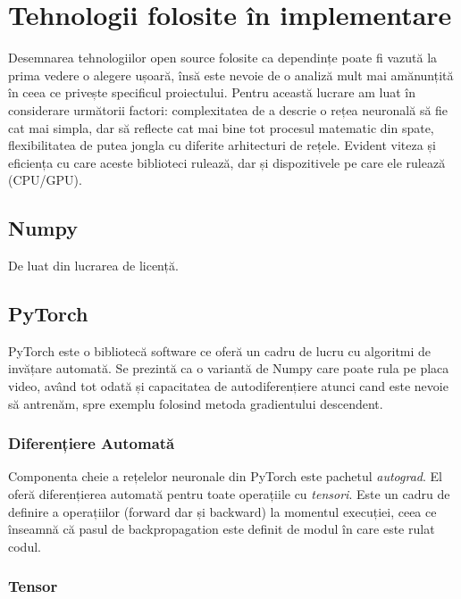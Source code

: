\chapter{Tehnologii folosite în implementare}

Desemnarea tehnologiilor open source folosite ca dependințe poate fi vazută la prima vedere o alegere ușoară, însă este nevoie de o analiză mult mai amănunțită în ceea ce privește specificul proiectului.
Pentru această lucrare am luat în considerare următorii factori: complexitatea de a descrie o rețea neuronală să fie cat mai simpla, dar să reflecte cat mai bine tot procesul matematic din spate, flexibilitatea de putea jongla cu diferite arhitecturi de rețele. Evident viteza și eficiența cu care aceste biblioteci rulează, dar și dispozitivele pe care ele rulează (CPU/GPU).

\section{Numpy}

De luat din lucrarea de licență.

\section{PyTorch}


PyTorch este o bibliotecă software ce oferă un cadru de lucru cu algoritmi de invățare automată. Se prezintă ca o variantă de Numpy care poate rula pe placa video, având tot odată și capacitatea de autodiferențiere atunci cand este nevoie să antrenăm, spre exemplu folosind metoda gradientului descendent.

\subsection{Diferențiere Automată}

Componenta cheie a rețelelor neuronale din PyTorch este pachetul \textit{autograd}. El oferă diferențierea automată pentru toate operațiile cu \textit{tensori}. Este un cadru de definire a operațiilor (forward dar și backward) la momentul execuției, ceea ce înseamnă că pasul de backpropagation este definit de modul în care este rulat codul.

\subsection{Tensor}

